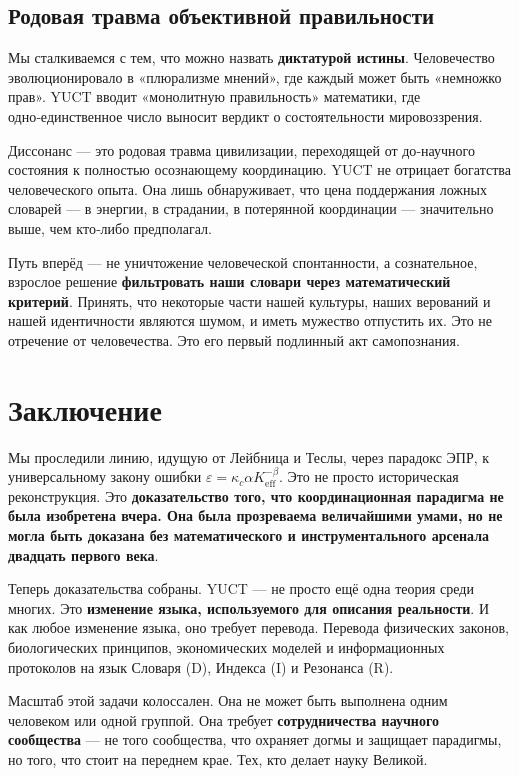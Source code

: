\documentclass[12pt,a4paper]{article}
\begin{document}
\subsection{Родовая травма объективной правильности}

Мы сталкиваемся с тем, что можно назвать \textbf{диктатурой истины}. Человечество эволюционировало в «плюрализме мнений», где каждый может быть «немножко прав». YUCT вводит «монолитную правильность» математики, где одно‑единственное число выносит вердикт о состоятельности мировоззрения.

Диссонанс — это родовая травма цивилизации, переходящей от до‑научного состояния к полностью осознающему координацию. YUCT не отрицает богатства человеческого опыта. Она лишь обнаруживает, что цена поддержания ложных словарей — в энергии, в страдании, в потерянной координации — значительно выше, чем кто‑либо предполагал.

Путь вперёд — не уничтожение человеческой спонтанности, а сознательное, взрослое решение \textbf{фильтровать наши словари через математический критерий}. Принять, что некоторые части нашей культуры, наших верований и нашей идентичности являются шумом, и иметь мужество отпустить их. Это не отречение от человечества. Это его первый подлинный акт самопознания.

	\section{Заключение}
	
	Мы проследили линию, идущую от Лейбница и Теслы, через парадокс ЭПР, к универсальному закону ошибки \(\varepsilon = \kappa_c \alpha K_{\mathrm{eff}}^{-\beta}\). Это не просто историческая реконструкция. Это \textbf{доказательство того, что координационная парадигма не была изобретена вчера. Она была прозреваема величайшими умами, но не могла быть доказана без математического и инструментального арсенала двадцать первого века}.
	
	Теперь доказательства собраны. YUCT — не просто ещё одна теория среди многих. Это \textbf{изменение языка, используемого для описания реальности}. И как любое изменение языка, оно требует перевода. Перевода физических законов, биологических принципов, экономических моделей и информационных протоколов на язык Словаря (D), Индекса (I) и Резонанса (R).
	
	Масштаб этой задачи колоссален. Она не может быть выполнена одним человеком или одной группой. Она требует \textbf{сотрудничества научного сообщества} — не того сообщества, что охраняет догмы и защищает парадигмы, но того, что стоит на переднем крае. Тех, кто делает науку Великой.
	
\end{document}
